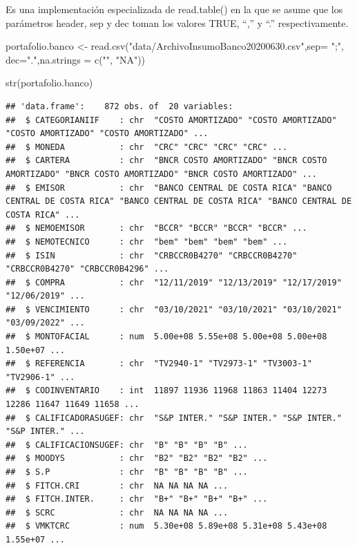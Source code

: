 \documentclass[
  12pt,
]{book}
\newenvironment{Shaded}{\begin{snugshade}}{\end{snugshade}}
\newcommand{\AttributeTok}[1]{\textcolor[rgb]{0.77,0.63,0.00}{#1}}
\newcommand{\FunctionTok}[1]{\textcolor[rgb]{0.00,0.00,0.00}{#1}}
\newcommand{\NormalTok}[1]{#1}
\newcommand{\OtherTok}[1]{\textcolor[rgb]{0.56,0.35,0.01}{#1}}
\newcommand{\StringTok}[1]{\textcolor[rgb]{0.31,0.60,0.02}{#1}}
\begin{document}
Es una implementación especializada de read.table() en la que se asume
que los parámetros header, sep y dec toman los valores TRUE, ``,'' y ``.'' respectivamente.

\begin{Shaded}
\begin{Highlighting}[]
\NormalTok{portafolio.banco }\OtherTok{\textless{}{-}} \FunctionTok{read.csv}\NormalTok{(}\StringTok{"data/ArchivoInsumoBanco20200630.csv"}\NormalTok{,}\AttributeTok{sep=} \StringTok{";"}\NormalTok{, }\AttributeTok{dec=}\StringTok{"."}\NormalTok{,}\AttributeTok{na.strings =} \FunctionTok{c}\NormalTok{(}\StringTok{""}\NormalTok{, }\StringTok{"NA"}\NormalTok{))}

\FunctionTok{str}\NormalTok{(portafolio.banco)}
\end{Highlighting}
\end{Shaded}

\begin{verbatim}
## 'data.frame':    872 obs. of  20 variables:
##  $ CATEGORIANIIF    : chr  "COSTO AMORTIZADO" "COSTO AMORTIZADO" "COSTO AMORTIZADO" "COSTO AMORTIZADO" ...
##  $ MONEDA           : chr  "CRC" "CRC" "CRC" "CRC" ...
##  $ CARTERA          : chr  "BNCR COSTO AMORTIZADO" "BNCR COSTO AMORTIZADO" "BNCR COSTO AMORTIZADO" "BNCR COSTO AMORTIZADO" ...
##  $ EMISOR           : chr  "BANCO CENTRAL DE COSTA RICA" "BANCO CENTRAL DE COSTA RICA" "BANCO CENTRAL DE COSTA RICA" "BANCO CENTRAL DE COSTA RICA" ...
##  $ NEMOEMISOR       : chr  "BCCR" "BCCR" "BCCR" "BCCR" ...
##  $ NEMOTECNICO      : chr  "bem" "bem" "bem" "bem" ...
##  $ ISIN             : chr  "CRBCCR0B4270" "CRBCCR0B4270" "CRBCCR0B4270" "CRBCCR0B4296" ...
##  $ COMPRA           : chr  "12/11/2019" "12/13/2019" "12/17/2019" "12/06/2019" ...
##  $ VENCIMIENTO      : chr  "03/10/2021" "03/10/2021" "03/10/2021" "03/09/2022" ...
##  $ MONTOFACIAL      : num  5.00e+08 5.55e+08 5.00e+08 5.00e+08 1.50e+07 ...
##  $ REFERENCIA       : chr  "TV2940-1" "TV2973-1" "TV3003-1" "TV2906-1" ...
##  $ CODINVENTARIO    : int  11897 11936 11968 11863 11404 12273 12286 11647 11649 11658 ...
##  $ CALIFICADORASUGEF: chr  "S&P INTER." "S&P INTER." "S&P INTER." "S&P INTER." ...
##  $ CALIFICACIONSUGEF: chr  "B" "B" "B" "B" ...
##  $ MOODYS           : chr  "B2" "B2" "B2" "B2" ...
##  $ S.P              : chr  "B" "B" "B" "B" ...
##  $ FITCH.CRI        : chr  NA NA NA NA ...
##  $ FITCH.INTER.     : chr  "B+" "B+" "B+" "B+" ...
##  $ SCRC             : chr  NA NA NA NA ...
##  $ VMKTCRC          : num  5.30e+08 5.89e+08 5.31e+08 5.43e+08 1.55e+07 ...
\end{verbatim}
\end{document}
